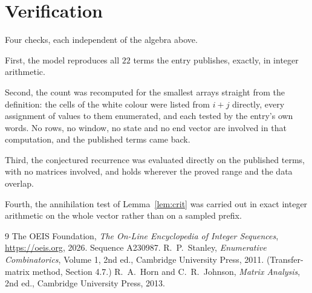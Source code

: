 \documentclass[11pt,a4paper]{article}
\theoremstyle{plain}
\theoremstyle{definition}
\begin{document}
\section{Verification}

Four checks, each independent of the algebra above.

First, the model reproduces all $22$ terms the entry publishes, exactly, in integer
arithmetic.

Second, the count was recomputed for the smallest arrays straight from the definition: the cells
of the white colour were listed from $i+j$ directly, every assignment of values to them
enumerated, and each tested by the entry's own words. No rows, no window, no state and no end
vector are involved in that computation, and the published terms came back.

Third, the conjectured recurrence was evaluated directly on the published terms, with no
matrices involved, and holds wherever the proved range and the data overlap.

Fourth, the annihilation test of Lemma~\ref{lem:crit} was carried out in exact integer
arithmetic on the whole vector rather than on a sampled prefix.

\begin{thebibliography}{9}
 The OEIS Foundation, \emph{The On-Line Encyclopedia of Integer
Sequences}, \url{https://oeis.org}, 2026. Sequence A230987.
 R.~P.~Stanley, \emph{Enumerative Combinatorics}, Volume 1, 2nd ed.,
Cambridge University Press, 2011. (Transfer-matrix method, Section 4.7.)
 R.~A.~Horn and C.~R.~Johnson, \emph{Matrix Analysis}, 2nd ed., Cambridge
University Press, 2013.
\end{thebibliography}
\end{document}
